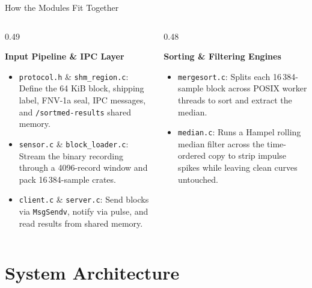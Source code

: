 \begin{frame}{How the Modules Fit Together}
  \begin{columns}[t, onlytextwidth]
    \begin{column}{0.49\textwidth}
      \smalltext\compactitem
      \begin{tech}
        \textbf{Input Pipeline \& IPC Layer}
        \begin{itemize}
          \item \texttt{protocol.h} \& \texttt{shm\_region.c}: Define the 64 KiB block, shipping label, FNV-1a seal, IPC messages, and \texttt{/sortmed-results} shared memory.
          \item \texttt{sensor.c} \& \texttt{block\_loader.c}: Stream the binary recording through a 4096-record window and pack 16\,384-sample crates.
          \item \texttt{client.c} \& \texttt{server.c}: Send blocks via \texttt{MsgSendv}, notify via pulse, and read results from shared memory.
        \end{itemize}
      \end{tech}
    \end{column}
    \begin{column}{0.48\textwidth}
      \smalltext\compactitem
      \begin{highlight}
        \textbf{Sorting \& Filtering Engines}
        \begin{itemize}
          \item \texttt{mergesort.c}: Splits each 16\,384-sample block across POSIX worker threads to sort and extract the median.
          \item \texttt{median.c}: Runs a Hampel rolling median filter across the time-ordered copy to strip impulse spikes while leaving clean curves untouched.
        \end{itemize}
      \end{highlight}
      \vskip1mm
    \end{column}
  \end{columns}
\end{frame}

\section{System Architecture}

